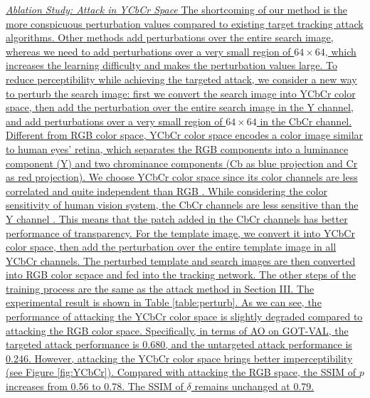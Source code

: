 \documentclass[journal]{IEEEtran}
\begin{document}
\uline{\textit{Ablation Study: Attack in YCbCr Space}
The shortcoming of our method is the more conspicuous perturbation values compared to existing target tracking attack algorithms. Other methods add perturbations over the entire search image, whereas we need to add perturbations over a very small region of $64 \times 64$, which increases the learning difficulty and makes the perturbation values large. To reduce perceptibility while achieving the targeted attack, we consider a new way to perturb the search image: first we convert the search image into YCbCr color space, then add the perturbation over the entire search image in the Y channel, and add perturbations over a very small region of $64 \times 64$ in the CbCr channel. Different from RGB color space, YCbCr color space encodes a color image similar to human eyes’ retina, which separates the RGB components into a luminance component (Y) and two chrominance components (Cb as blue projection and Cr as red projection). We choose YCbCr color space since its color channels are less correlated and quite independent than RGB \cite{8630918}. While considering the color sensitivity of human vision system, the CbCr channels are less sensitive than the Y channel \cite{8630918}. This means that the patch added in the CbCr channels has better performance of transparency.
For the template image, we convert it into YCbCr color space, then add the perturbation over the entire template image in all YCbCr channels. The perturbed template and search images are then converted into RGB color scpace and fed into the tracking network. The other steps of the training process are the same as the attack method in Section III. The experimental result is shown in Table \ref{table:perturb}. As we can see, the performance of attacking the YCbCr color space is slightly degraded compared to attacking the RGB color space. Specifically, in terms of AO on GOT-VAL, the targeted attack performance is 0.680, and the untargeted attack performance is 0.246. However, attacking the YCbCr color space brings better imperceptibility (see Figure \ref{fig:YCbCr}). Compared with attacking the RGB space, the SSIM of $p$ increases from 0.56 to 0.78. The SSIM of $\delta$ remains unchanged at 0.79.
}
\end{document}
